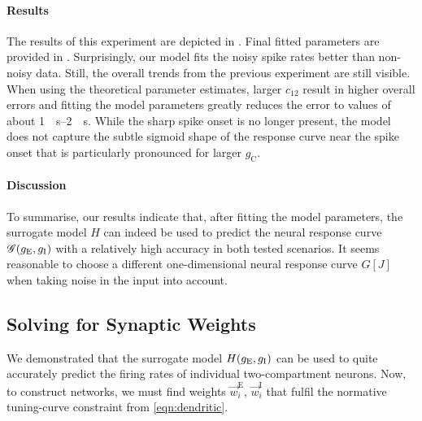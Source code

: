 \paragraph{Results}
The results of this experiment are depicted in .
Final fitted parameters are provided in .
Surprisingly, our model fits the noisy spike rates better than non-noisy data.
Still, the overall trends from the previous experiment are still visible.
When using the theoretical parameter estimates, larger $c_{12}$ result in higher overall errors and fitting the model parameters greatly reduces the error to values of about \SIrange{1}{2}{\per\second}.
While the sharp spike onset is no longer present, the model does not capture the subtle sigmoid shape of the response curve near the spike onset that is particularly pronounced for larger $g_\mathrm{C}$.

\paragraph{Discussion}
To summarise, our results indicate that, after fitting the model parameters, the surrogate model $H$ can indeed be used to predict the neural response curve $\mathscr{G}(g_\mathrm{E}, g_\mathrm{I})$ with a relatively high accuracy in both tested scenarios.
It seems reasonable to choose a different one-dimensional neural response curve $G[J]$ when taking noise in the input into account.


\subsection{Solving for Synaptic Weights}
\label{sec:two_comp_synaptic_weights}

We demonstrated that the surrogate model $H(g_\mathrm{E}, g_\mathrm{I})$ can be used to quite accurately predict the firing rates of individual two-compartment neurons.
Now, to construct \NEF networks, we must find weights $\vec w^\mathrm{E}_i$, $\vec w^\mathrm{I}_i$ that fulfil the normative tuning-curve constraint from \cref{eqn:dendritic}.

